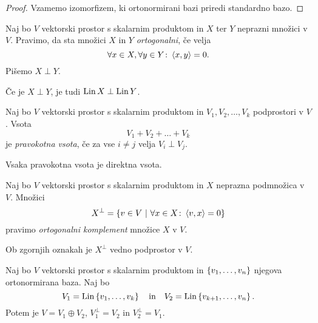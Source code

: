 \documentclass[12pt, a4paper]{article}
\begin{document}
\begin{proof}
Vzamemo izomorfizem, ki ortonormirani bazi priredi standardno bazo.
\end{proof}

\begin{definicija}
Naj bo $V$ vektorski prostor s  skalarnim produktom in $X$ ter $Y$ neprazni množici v $V$. Pravimo, da sta množici $X$ in $Y$ \emph{ortogonalni}, če velja
\[
\forall x\in X,\forall y\in Y\colon \left\langle x,y\right\rangle=0.
\]
Pišemo $X\perp Y$.
\end{definicija}

\begin{trditev}
Če je $X\perp Y$, je tudi $\operatorname{Lin} X\perp\operatorname{Lin} Y$.
\end{trditev}

\obvs

\begin{definicija}
Naj bo $V$ vektorski prostor s skalarnim produktom in $V_1,V_2,\dots,V_k$ podprostori v $V$. Vsota
\[
V_1+V_2+\dots+V_k
\]
je \emph{pravokotna vsota}, če za vse $i\ne j$ velja $V_i\perp V_j$.
\end{definicija}

\begin{trditev}
Vsaka pravokotna vsota je direktna vsota.
\end{trditev}

\obvs

\begin{definicija}
Naj bo $V$ vektorski prostor s skalarnim produktom in $X$ neprazna podmnožica v $V$. Množici
\[
X^\bot=\left\{v\in V~\middle\vert~\forall x\in X\colon\left\langle v,x\right\rangle=0\right\}
\]
pravimo \emph{ortogonalni komplement} množice $X$ v $V$.
\end{definicija}

\begin{trditev}
Ob zgornjih oznakah je $X^\bot$ vedno podprostor v $V$.
\end{trditev}

\obvs

\begin{trditev}\label{td:ortg}
Naj bo $V$ vektorski prostor s skalarnim produktom in $\left\{v_1,\dots,v_n\right\}$ njegova ortonormirana baza. Naj bo
\[
V_1=\operatorname{Lin}\left\{v_1,\dots,v_k\right\}\quad\text{in}\quad V_2=\operatorname{Lin}\left\{v_{k+1},\dots,v_n\right\}.
\]
Potem je $V=V_1\oplus V_2$, $V_1^\bot=V_2$ in $V_2^\bot=V_1$.
\end{trditev}

\obvs
\end{document}
